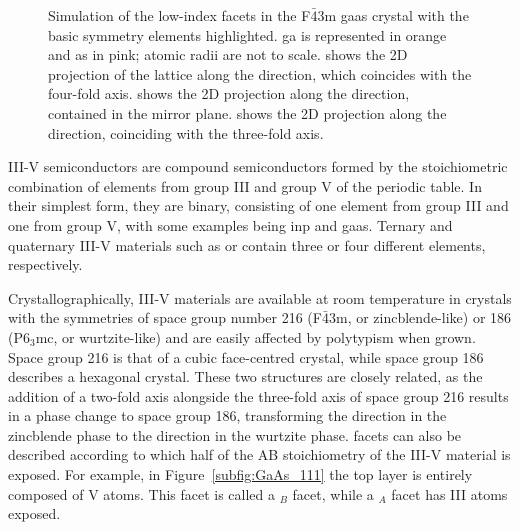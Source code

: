 \begin{figure}
{
    }
    \caption[Low-index facets in the F\(\bar{4}\)3m \acs{gaas} crystal.]{Simulation of the low-index facets in the F\(\bar{4}\)3m \acs{gaas} crystal with the basic symmetry elements highlighted. \Acl{ga} is represented in orange and \acs{as} in pink; atomic radii are not to scale.  shows the 2D projection of the lattice along the  direction, which coincides with the four-fold axis.  shows the 2D projection along the  direction, contained in the mirror plane.  shows the 2D projection along the  direction, coinciding with the three-fold axis.}
    \label{fig:ZB_low_index_facets}
\end{figure}

III-V semiconductors are compound semiconductors formed by the stoichiometric combination of elements from group III and group V of the periodic table. In their simplest form, they are binary, consisting of one element from group III and one from group V, with some examples being \acs{inp} and \acs{gaas}. Ternary and quaternary III-V materials such as  or  contain three or four different elements, respectively. 

Crystallographically, III-V materials are available at room temperature in crystals with the symmetries of space group number \num{216} (F\(\bar{4}\)3m, or zincblende-like) or \num{186} (P6\(_3\)mc, or wurtzite-like) and are easily affected by polytypism when grown. Space group \num{216} is that of a cubic face-centred crystal, while space group \num{186} describes a hexagonal crystal. These two structures are closely related, as the addition of a two-fold axis alongside the three-fold axis of space group \num{216} results in a phase change to space group \num{186}, transforming the  direction in the zincblende phase to the  direction in the wurtzite phase.  facets can also be described according to which half of the AB stoichiometry of the III-V material is exposed. For example, in Figure~\ref{subfig:GaAs_111} the top layer is entirely composed of V atoms. This facet is called a \(_B\) facet, while a \(_A\) facet has III atoms exposed.

